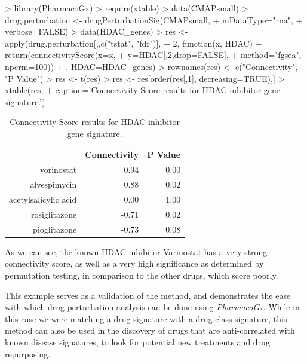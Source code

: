 \documentclass[11pt]{article}
\begin{document}
\begin{Schunk}
\begin{Sinput}
>   library(PharmacoGx)
>   require(xtable)
>   data(CMAPsmall)
>   drug.perturbation <- drugPerturbationSig(CMAPsmall, 
+                                            mDataType="rna",
+                                            verbose=FALSE)
>   data(HDAC_genes)
>   res <- apply(drug.perturbation[,,c("tstat", "fdr")],
+                2, function(x, HDAC){ 
+ 	    return(connectivityScore(x=x, 
+ 	                             y=HDAC[,2,drop=FALSE], 
+                                method="fgsea", nperm=100))
+ 	}, HDAC=HDAC_genes)
>   rownames(res) <- c("Connectivity", "P Value")
>   res <- t(res)
>   res <- res[order(res[,1], decreasing=TRUE),]
>   xtable(res, 
+     caption='Connectivity Score results for HDAC inhibitor gene signature.')
\end{Sinput}
\begin{table}[ht]
\centering
\begin{tabular}{rrr}
  \hline
 & Connectivity & P Value \\ 
  \hline
vorinostat & 0.94 & 0.00 \\ 
  alvespimycin & 0.88 & 0.02 \\ 
  acetylsalicylic acid & 0.00 & 1.00 \\ 
  rosiglitazone & -0.71 & 0.02 \\ 
  pioglitazone & -0.73 & 0.08 \\ 
   \hline
\end{tabular}
\caption{Connectivity Score results for HDAC inhibitor gene signature.} 
\end{table}\end{Schunk}
As we can see, the known HDAC inhibitor Varinostat has a very strong connectivity score, as well as a very high significance as determined by permutation testing, in comparison to the other drugs, which score poorly. 

This example serves as a validation of the method, and demonstrates the ease with which drug perturbation analysis can be done using \textit{PharmacoGx}. While in this case we were matching a drug signature with a drug class signature, this method can also be used in the discovery of drugs that are anti-correlated with known disease signatures, to look for potential new treatments and drug repurposing.


\end{document}

